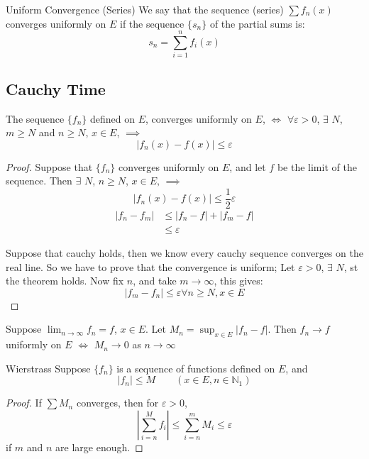 \documentclass{article}
\newcommand{\N}{\mathbb{N}}
\newcommand{\e}{\varepsilon}
\newcommand{\ex}{\exists\,}
\begin{document}
{{{{\noindent\begin{definition}{Uniform Convergence (Series)}{}
   We say that the sequence (series) $\sum f_n(x)$ converges uniformly on $E$ if the sequence $\{ s_n \}$ of the partial sums is:
   $$ s_n = \sum_{i=1}^n {f_i (x)} $$
\end{definition}\vspace{10pt}


\subsection{Cauchy Time}
\noindent\begin{theorem}{}{}
   The sequence $\{f_n\}$ defined on $E$, converges uniformly on $E$, $\iff$ $\forall \e > 0$, $\ex\,N$, $m \geq N$ and $n\geq N$, $x \in E$, $\implies$
   $$ |f_n(x) - f(x)|\le \e $$
\end{theorem}\vspace{10pt}

\begin{proof}
  Suppose that $\{f_n\}$ converges uniformly on $E$, and let $f$ be the limit of the sequence. Then $\ex\,N$, $n\geq N$, $x\in E,\,\implies$
  $$ |f_n(x) - f(x)| \le \frac{1}{2}\e $$
  \begin{align*}
    |f_n - f_m| &\le |f_n - f| + |f_m - f|\\
    &\le \e
  \end{align*}

  Suppose that cauchy holds, then we know every cauchy sequence converges on the real line. So we have to prove that the convergence is uniform; Let $\e >0$, $\ex\,N$, st the theorem holds. Now fix $n$, and take $m \to \infty$, this gives:
  $$ |f_m - f_n| \le \e \forall n \geq N, x\in E $$
\end{proof}

\noindent\begin{theorem}{}{}
   Suppose $\displaystyle{\lim_{n\to\infty}{f_n} = f}$, $x\in E$. Let $\displaystyle{M_n = \sup_{x\in E}{|f_n - f|}}$. Then $f_n \to f$ uniformly on $E$ $\iff$ $M_n \to 0$ as $n \to \infty$
\end{theorem}\vspace{10pt}


\noindent\begin{theorem}{Wierstrass}{}
  Suppose $\{f_n\}$ is a sequence of functions defined on $E$, and
  $$ |f_n| \le M \qquad (x\in E, n\in\N_1) $$
\end{theorem}\vspace{10pt}
\begin{proof}
  If $\displaystyle{\sum M_n}$ converges, then for $\e > 0$,
  $$ \left | \sum_{i = n}^M {f_i} \right| \le \sum_{i = n}^m {M_i} \le \e $$
  if $m$ and $n$ are large enough.
\end{proof}

}}}}
\end{document}
